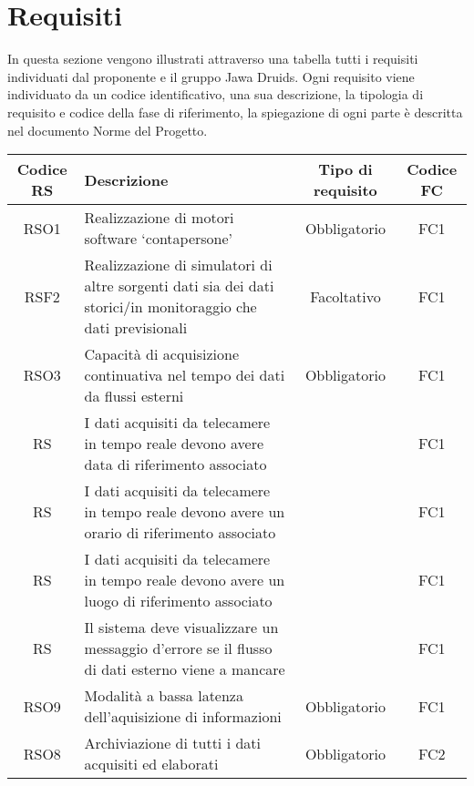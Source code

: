 \chapter{Requisiti}
In questa sezione vengono illustrati attraverso una tabella tutti i requisiti individuati dal proponente e il gruppo Jawa Druids. Ogni requisito viene individuato da un codice identificativo, una sua descrizione, la tipologia di requisito e codice della fase di riferimento, la spiegazione di ogni parte è descritta nel documento Norme del Progetto. 

\def\tabularxcolumn#1{m{#1}}
{
	
	\begin{center}
		\renewcommand{\arraystretch}{1.4}
		\begin{tabularx}{\textwidth}{ |c|X|c|c| }
			\hline
			\rowcolor{Melon}
			\textbf{Codice RS} & \textbf{Descrizione} & \textbf{Tipo di requisito} & \textbf{Codice FC} \\
			\hline
			RSO1 & Realizzazione di motori software ‘contapersone’  & Obbligatorio & FC1  \\
			\hline
			RSF2 & Realizzazione di simulatori di altre sorgenti dati sia dei dati storici/in monitoraggio che dati previsionali & Facoltativo & FC1 \\
			\hline
			RSO3 & Capacità di acquisizione continuativa nel tempo dei dati da flussi esterni & Obbligatorio & FC1   \\
			\hline
			RS  & I dati acquisiti da telecamere in tempo reale devono avere data di riferimento associato  &  & FC1 \\
			\hline
			RS  & I dati acquisiti da telecamere in tempo reale devono avere un orario di riferimento associato &  & FC1 \\
			\hline
			RS  & I dati acquisiti da telecamere in tempo reale devono avere un luogo di riferimento associato &  & FC1 \\
			\hline
			RS  & Il sistema deve visualizzare un messaggio d'errore se il flusso di dati esterno viene a mancare  &  & FC1 \\
			\hline
			RSO9 & Modalità a bassa latenza dell'aquisizione di informazioni & Obbligatorio & FC1 \\
			\hline
			RSO8 & Archiviazione di tutti i dati acquisiti ed elaborati & Obbligatorio & FC2  \\
			

\end{tabularx}
\end{center}}
